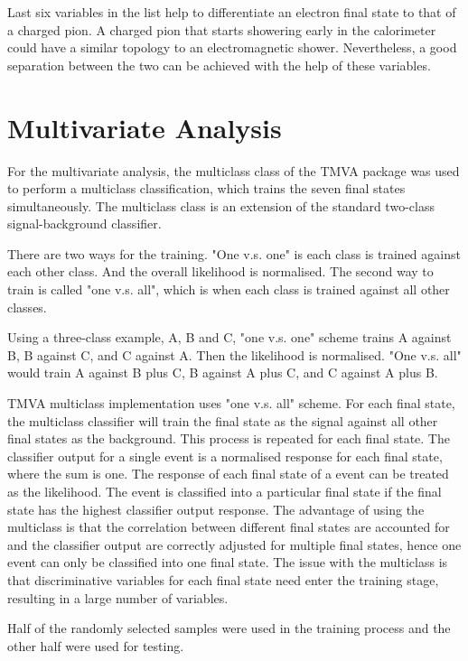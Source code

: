 Last six variables in the list help to differentiate an electron final state to that of a charged pion. A charged pion that starts showering early in the calorimeter could have a similar topology to an electromagnetic shower. Nevertheless, a good separation between the two can be achieved with the help of these variables.

\section{Multivariate Analysis}

For the multivariate analysis, the multiclass class of the TMVA package \cite{Therhaag:2009dp} was used to perform a multiclass classification, which trains the seven final states simultaneously. The multiclass class is an extension of the standard two-class signal-background classifier.

There are two ways for the training. "One v.s. one" is each class is trained against each other class. And the overall likelihood is normalised. The second way to train is called "one v.s. all", which is when each class is trained against all other classes.

Using a three-class example, A, B and C, "one v.s. one" scheme trains A against B, B against C, and C against A. Then the likelihood is normalised. "One v.s. all" would train A against B plus C, B against A plus C, and C against A plus B.

TMVA multiclass implementation uses "one v.s. all" scheme. For each final state, the multiclass classifier will train the final state as the signal against all other final states as the background. This process is repeated for each final state. The classifier output for a single event is a normalised response for each final state, where the sum is one. The response of each final state of a event can be treated as the likelihood. The event is classified into a particular final state if the final state has the highest classifier output response. The advantage of using the multiclass is that the correlation between different final states are accounted for and the classifier output are correctly adjusted for multiple final states, hence one event can only be classified into one final state. The issue with the multiclass is that discriminative variables for each final state need enter the training stage, resulting in a large number of variables.

Half of the randomly selected samples were used in the training process and the other half were used for testing.

